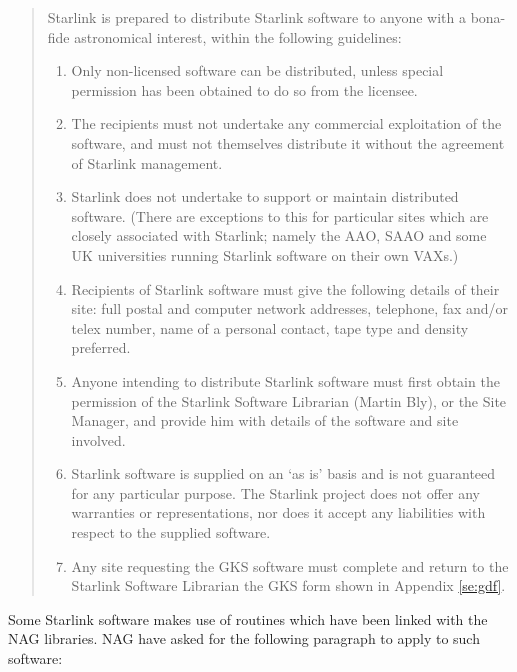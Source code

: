 \begin{quote}
Starlink is prepared to distribute Starlink software to anyone with a bona-fide
astronomical interest, within the following guidelines:

\begin{enumerate}

\item Only non-licensed software can be distributed, unless special permission
has been obtained to do so from the licensee.

\item The recipients must not undertake any commercial exploitation of the
software, and must not themselves distribute it without the agreement of
Starlink management.

\item Starlink does not undertake to support or maintain distributed software.
(There are exceptions to this for particular sites which are closely associated
with Starlink; namely the AAO, SAAO and some UK universities running Starlink
software on their own VAXs.)

\item Recipients of Starlink software must give the following details of their
site: full postal and computer network addresses, telephone, fax and/or telex
number, name of a personal contact, tape type and density preferred.

\item Anyone intending to distribute Starlink software must first obtain the
permission of the Starlink Software Librarian (Martin Bly), or the Site
Manager, and provide him  with details of the software and site involved.

\item Starlink software is supplied on an `as is' basis and is not guaranteed
for any particular purpose. The Starlink project does not offer any warranties
or representations, nor does it accept any liabilities with respect to the
supplied software.

\item Any site requesting the GKS software must complete and return to the
Starlink Software Librarian the GKS form shown in Appendix \ref{se:gdf}. 

\end{enumerate}

\end{quote}

Some Starlink software makes use of routines which have been linked with the
NAG libraries.
NAG have asked for the following paragraph to apply to such software:

